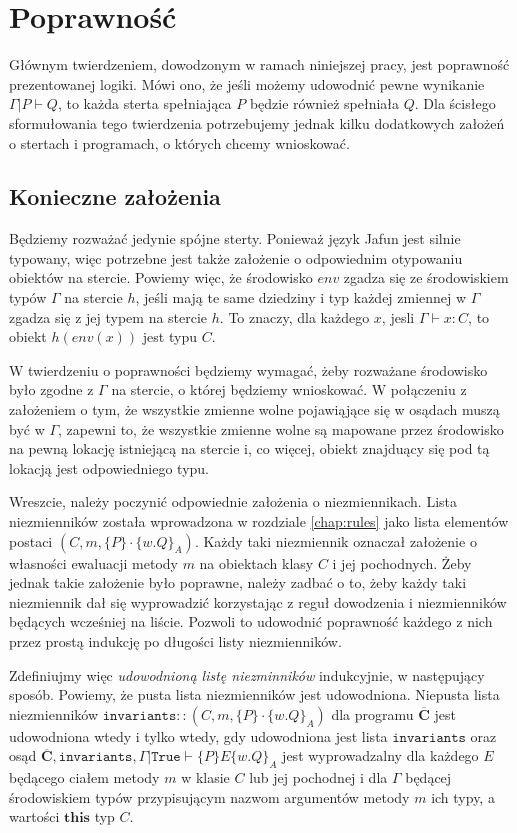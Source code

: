 \documentclass[]{pracamgr}
\newcommand \hoare [5] {\{#1\}#2\{#4.#5\}_#3}
\renewcommand \| {\hspace{0.75em} | \hspace{0.75em} }
\renewcommand \[ {[\![}
\renewcommand \] {]\!]}
\theoremstyle{definition}
\newcommand{\jthis}{\textbf{this}\xspace}
\begin{document}
\chapter{Poprawność}
\label{chap:soundness}
Głównym twierdzeniem, dowodzonym w ramach niniejszej pracy, jest poprawność prezentowanej logiki.
Mówi ono, że jeśli możemy udowodnić pewne wynikanie $\Gamma | P \vdash Q$,
to każda sterta spełniająca $P$ będzie również spełniała $Q$.
Dla ścisłego sformułowania tego twierdzenia potrzebujemy jednak kilku dodatkowych założeń o stertach
i programach, o których chcemy wnioskować.

\section{Konieczne założenia}
Będziemy rozważać jedynie spójne sterty. Ponieważ język Jafun jest silnie typowany, więc potrzebne
jest także założenie o odpowiednim otypowaniu obiektów na stercie.
Powiemy więc, że środowisko $\mathit{env}$ zgadza się ze środowiskiem typów $\Gamma$ na stercie $h$,
jeśli mają te same dziedziny i typ każdej zmiennej w $\Gamma$ zgadza się z jej typem na stercie $h$.
To znaczy, dla każdego $x$, jesli $\Gamma \vdash x : C$, to obiekt $h(\mathit{env}(x))$ jest typu $C$.

W twierdzeniu o poprawności będziemy wymagać, żeby rozważane środowisko było zgodne z $\Gamma$
na stercie, o której będziemy wnioskować. W połączeniu z założeniem o tym, że wszystkie zmienne wolne
pojawiąjące się w osądach muszą być w $\Gamma$, zapewni to, że wszystkie zmienne wolne są mapowane
przez środowisko na pewną lokację istniejącą na stercie i, co więcej, obiekt znajduący się pod tą
lokacją jest odpowiedniego typu.

Wreszcie, należy poczynić odpowiednie założenia o niezmiennikach.
Lista niezmienników została wprowadzona w rozdziale \ref{chap:rules} jako lista elementów postaci
$(C, m, \hoare{P}{\cdot}{A}{w}{Q})$.
Każdy taki niezmiennik oznaczał założenie o własności ewaluacji metody $m$ na obiektach klasy
$C$ i jej pochodnych.
Żeby jednak takie założenie było poprawne, należy zadbać o to, żeby każdy taki niezmiennik dał
się wyprowadzić korzystając z reguł dowodzenia i niezmienników będących wcześniej na liście.
Pozwoli to udowodnić poprawność każdego z nich przez prostą indukcję po długości listy niezmienników.

Zdefiniujmy więc \textit{udowodnioną listę niezminników} indukcyjnie, w następujący sposób.
Powiemy, że pusta lista niezmienników jest udowodniona.
Niepusta lista niezmienników $\mathtt{invariants}::(C, m, \hoare{P}{\cdot}{A}{w}{Q})$ dla
programu $\overline{\mathbf{C}}$ jest
udowodniona wtedy i tylko wtedy, gdy udowodniona jest lista $\mathtt{invariants}$ oraz osąd
$\overline{\mathbf{C}}, \mathtt{invariants}, \Gamma | \mathtt{True} \vdash \hoare{P}{E}{A}{w}{Q}$
jest wyprowadzalny dla każdego $E$ będącego ciałem metody $m$ w klasie $C$ lub jej pochodnej i
dla $\Gamma$ będącej środowiskiem typów przypisującym nazwom argumentów metody
$m$ ich typy, a wartości $\jthis$ typ $C$.
\end{document}
